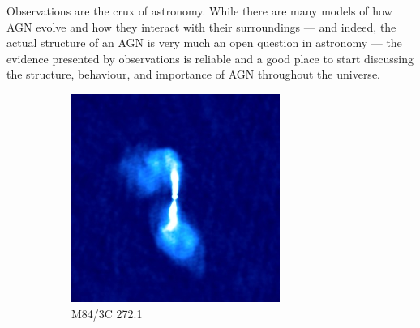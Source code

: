         Observations are the crux of astronomy. While there are many models of how AGN evolve and how they interact with their surroundings --- and indeed, the actual structure of an AGN is very much an open question in astronomy --- the evidence presented by observations is reliable and a good place to start discussing the structure, behaviour, and importance of AGN throughout the universe.

        \begin{figure}
            \centering
            \begin{subfigure}{0.45\textwidth}
                \includegraphics[width=\textwidth]{images/3C_272.1.jpg}
                \caption{M84/3C 272.1}
                \label{fig:m84}
            \end{subfigure}
            \begin{subfigure}{0.45\textwidth}

\end{subfigure}
\end{figure}
